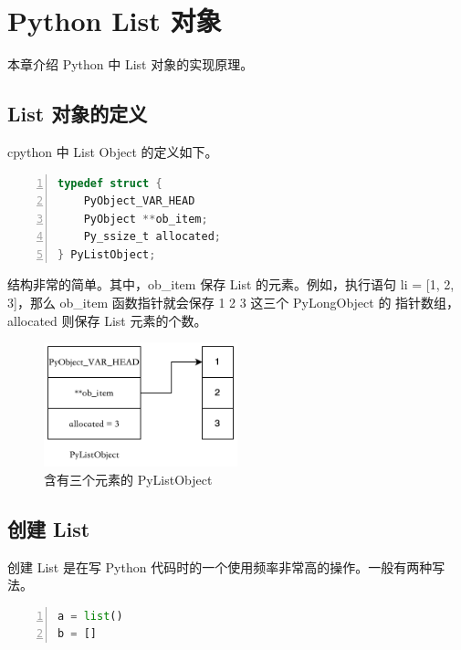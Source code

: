 
\chapter{Python List 对象}

本章介绍 Python 中 List 对象的实现原理。

\section{List 对象的定义}

cpython 中 List Object 的定义如下。

\begin{lstlisting}[language=C, numbers=left, numbersep=1em, numberstyle=\footnotesize , breaklines=true]
typedef struct {
    PyObject_VAR_HEAD
    PyObject **ob_item;
    Py_ssize_t allocated;
} PyListObject;
\end{lstlisting}

结构非常的简单。其中，ob\_item 保存 List 的元素。例如，执行语句 li = [1, 2, 3]，那么 ob\_item 函数指针就会保存 1 2 3 这三个 PyLongObject 的
指针数组，allocated 则保存 List 元素的个数。 

\begin{figure}[htbp]
\centering
  \includegraphics[width=0.5\textwidth]{pictures/ch7_01.png}
  \caption{含有三个元素的 PyListObject \label{fig:scatter}}
\end{figure}

\section{创建 List}

创建 List 是在写 Python 代码时的一个使用频率非常高的操作。一般有两种写法。

\begin{lstlisting}[language=Python, numbers=left, numbersep=1em, numberstyle=\footnotesize , breaklines=true]
a = list()
b = []
\end{lstlisting}

